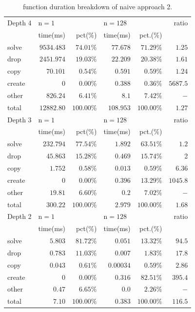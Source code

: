 \begin{table}
\begin{tabular}{|l|r|r|r|r|r|}
\hline Depth 4 & \multicolumn{2}{|l|}{$\mathrm{n}=1$} & \multicolumn{2}{|l|}{$\mathrm{n}=128$} & ratio \\
\cline { 2 - 5 } & \multicolumn{1}{|l|}{ time(ms) } & pct(\%) & time(ms) & pct.(\%) & \\
\hline solve & $9534.483$ & $74.01 \%$ & $77.678$ & $71.29 \%$ & $1.25$ \\
\hline drop & $2451.974$ & $19.03 \%$ & $22.209$ & $20.38 \%$ & $1.61$ \\
\hline copy & $70.101$ & $0.54 \%$ & $0.591$ & $0.59 \%$ & $1.24$ \\
\hline create & 0 & $0.00 \%$ & $0.388$ & $0.36 \%$ & $5687.5$ \\
\hline other & $826.24$ & $6.41 \%$ & $8.1$ & $7.42 \%$ & $-$ \\
\hline total & $12882.80$ & $100.00 \%$ & $108.953$ & $100.00 \%$ & $1.27$ \\
\hline Depth 3 & \multicolumn{2}{|l|}{$\mathrm{n}=1$} & \multicolumn{2}{|l|}{$\mathrm{n}=128$} & ratio \\
\cline { 2 - 5 } & \multicolumn{1}{|l|}{ time(ms) } & pct(\%) & time(ms) & pct.(\%) & \\
\hline solve & $232.794$ & $77.54 \%$ & $1.892$ & $63.51 \%$ & $1.2$ \\
\hline drop & $45.863$ & $15.28 \%$ & $0.469$ & $15.74 \%$ & 2 \\
\hline copy & $1.752$ & $0.58 \%$ & $0.013$ & $0.59 \%$ & $6.36$ \\
\hline create & 0 & $0.00 \%$ & $0.396$ & $13.29 \%$ & $1045.8$ \\
\hline other & $19.81$ & $6.60 \%$ & $0.2$ & $7.02 \%$ & $-$ \\
\hline total & $300.22$ & $100.00 \%$ & $2.979$ & $100.00 \%$ & $1.68$ \\
\hline Depth 2& \multicolumn{2}{|l|}{$\mathrm{n}=1$} & \multicolumn{2}{|l|}{$\mathrm{n}=128$} & ratio \\
\cline { 2 - 5 } & \multicolumn{1}{|l|}{ time(ms) } & pct(\%) & time(ms) & pct.(\%) & \\
\hline solve & $5.803$ & $81.72 \%$ & $0.051$ & $13.32 \%$ & $94.5$ \\
\hline drop & $0.783$ & $11.03 \%$ & $0.007$ & $1.83 \%$ & $17.8$ \\
\hline copy & $0.043$ & $0.61 \%$ & $0.00034$ & $0.59 \%$ & $2.86$ \\
\hline create & 0 & $0.00 \%$ & $0.316$ & $82.51 \%$ & $395.4$ \\
\hline other & $0.47$ & $6.65 \%$ & $0.0$ & $2.26 \%$ & $-$ \\
\hline total & $7.10$ & $100.00 \%$ & $0.383$ & $100.00 \%$ & $116.5$ \\
\hline
\end{tabular}
\caption{function duration breakdown of naive approach 2.}
\label{tab:function_duration_naive}
\end{table}

